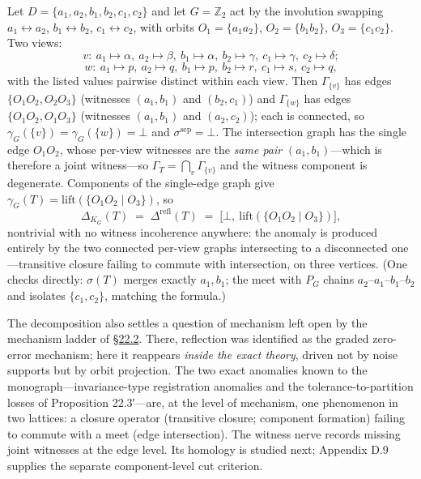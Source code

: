 \begin{thmrem}

Let \(D = \{a_1, a_2, b_1, b_2, c_1, c_2\}\) and let \(G = \mathbb{Z}_2\) act by the involution swapping \(a_1 \leftrightarrow a_2\), \(b_1 \leftrightarrow b_2\), \(c_1 \leftrightarrow c_2\), with orbits \(O_1 = \{a_1 a_2\}\), \(O_2 = \{b_1 b_2\}\), \(O_3 = \{c_1 c_2\}\). Two views:
\[
v:\ a_1 \mapsto \alpha,\ a_2 \mapsto \beta,\ b_1 \mapsto \alpha,\ b_2 \mapsto \gamma,\ c_1 \mapsto \gamma,\ c_2 \mapsto \delta;
\]
\[
w:\ a_1 \mapsto p,\ a_2 \mapsto q,\ b_1 \mapsto p,\ b_2 \mapsto r,\ c_1 \mapsto s,\ c_2 \mapsto q,
\]
with the listed values pairwise distinct within each view. Then \(\Gamma_{\{v\}}\) has edges \(\{O_1O_2, O_2O_3\}\) (witnesses \((a_1, b_1)\) and \((b_2, c_1)\)) and \(\Gamma_{\{w\}}\) has edges \(\{O_1O_2, O_1O_3\}\) (witnesses \((a_1, b_1)\) and \((a_2, c_2)\)); each is connected, so \(\gamma_G(\{v\}) = \gamma_G(\{w\}) = \bot\) and \(\sigma^{\mathrm{sep}} = \bot\). The intersection graph has the single edge \(O_1O_2\), whose per-view witnesses are the \emph{same pair} \((a_1, b_1)\)---\hspace{0pt}which is therefore a joint witness---\hspace{0pt}so \(\Gamma_T = \bigcap_v \Gamma_{\{v\}}\) and the witness component is degenerate. Components of the single-edge graph give \(\gamma_G(T) = \mathrm{lift}(\{O_1 O_2 \mid O_3\})\), so
\[
\Delta_{K_G}(T) \;=\; \Delta^{\mathrm{refl}}(T) \;=\; \big[\bot,\ \mathrm{lift}(\{O_1O_2 \mid O_3\})\big],
\]
nontrivial with no witness incoherence anywhere: the anomaly is produced entirely by the two connected per-view graphs intersecting to a disconnected one---\hspace{0pt}transitive closure failing to commute with intersection, on three vertices. (One checks directly: \(\sigma(T)\) merges exactly \(a_1, b_1\); the meet with \(P_G\) chains \(a_2\)--\(a_1\)--\(b_1\)--\(b_2\) and isolates \(\{c_1, c_2\}\), matching the formula.)
\end{thmrem}

The decomposition also settles a question of mechanism left open by the mechanism ladder of \hyperlink{sec:22.2}{§22.2}. There, reflection was identified as the graded zero-error mechanism; here it reappears \emph{inside the exact theory}, driven not by noise supports but by orbit projection. The two exact anomalies known to the monograph---\hspace{0pt}invariance-type registration anomalies and the tolerance-to-partition losses of Proposition 22.3′---\hspace{0pt}are, at the level of mechanism, one phenomenon in two lattices: a closure operator (transitive closure; component formation) failing to commute with a meet (edge intersection). The witness nerve records missing joint witnesses at the edge level. Its homology is studied next; Appendix D.9 supplies the separate component-level cut criterion.

